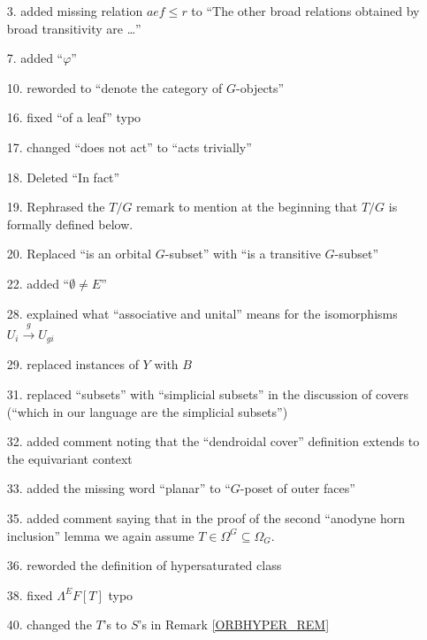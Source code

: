 \documentclass{article}
\begin{document}
\begin{itemize}
\item[3.] added missing relation $aef \leq r$ to ``The other broad relations obtained by broad transitivity are \dots''
\item[7.] added ``$\varphi$''
\item[10.] reworded to ``denote the category of $G$-objects''
\item[16.] fixed ``of a leaf'' typo
\item[17.] changed ``does not act'' to ``acts trivially''
\item[18.] Deleted ``In fact''
\item[19.] Rephrased the $T/G$ remark to mention at the beginning that $T/G$ is formally defined below.
\item[20.] Replaced ``is an orbital $G$-subset'' with ``is a transitive $G$-subset''
\item[22.] added ``$\emptyset \neq E$''
\item[28.] explained what ``associative and unital'' means for the isomorphisms $U_i \xrightarrow{g} U_{gi}$
\item[29.] replaced instances of $Y$ with $B$
\item[31.] replaced ``subsets'' with ``simplicial subsets'' in the discussion of covers (``which in our language are the simplicial subsets'')
\item[32.] added comment noting that the ``dendroidal cover'' definition extends to the equivariant context
\item[33.] added the missing word ``planar'' to ``$G$-poset of outer faces''
\item[35.] added comment saying that in the proof of the second ``anodyne horn inclusion'' lemma we again assume $T \in \Omega^G \subseteq \Omega_G$.
\item[36.] reworded the definition of hypersaturated class
\item[38.] fixed $\Lambda^EF[T]$ typo
\item[40.] changed the $T$'s to $S$'s in Remark \ref{ORBHYPER_REM} %

\end{itemize}
\end{document}
